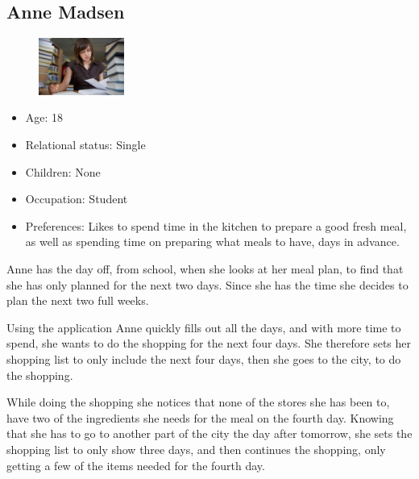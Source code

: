 \subsection{Anne Madsen}
\begin{figure}[H]
	\includegraphics[width=0.25\textwidth]{Grafik/FoodPlanner/PersonaAnneMadsen}
	\label{PersonaHenrikJensen}
\end{figure}
\begin{itemize}
	\item Age: 18
	\item Relational status: Single
	\item Children: None
	\item Occupation: Student
	\item Preferences: Likes to spend time in the kitchen to prepare a good fresh meal, as well as spending time on preparing what meals to have, days in advance.
\end{itemize}
Anne has the day off, from school, when she looks at her meal plan, to find that she has only planned for the next two days. Since she has the time she decides to plan the next two full weeks.

Using the application Anne quickly fills out all the days, and with more time to spend, she wants to do the shopping for the next four days. She therefore sets her shopping list to only include the next four days, then she goes to the city, to do the shopping.

While doing the shopping she notices that none of the stores she has been to, have two of the ingredients she needs for the meal on the fourth day. Knowing that she has to go to another part of the city the day after tomorrow, she sets the shopping list to only show three days, and then continues the shopping, only getting a few of the items needed for the fourth day.